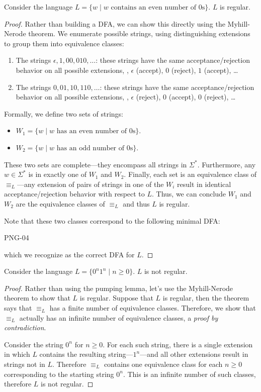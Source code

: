 \documentclass[11pt]{book}
\begin{document}
\begin{claim}
  Consider the language $L = \{ w \;|\; \text{$w$ contains an even number of $0$s} \}$.
  $L$ is regular.
\end{claim}
\begin{proof}
  Rather than building a DFA, we can show this directly using the Myhill-Nerode theorem.
  We enumerate possible strings, using distinguishing extensions to group them into equivalence classes:
  \begin{enumerate}
    \item The strings $\epsilon, 1, 00, 010, \ldots$: these strings have the same acceptance/rejection behavior on all possible extensions, \eg, $\epsilon$ (accept), $0$ (reject), $1$ (accept), \ldots
    \item The strings $0, 01, 10, 110, \ldots$: these strings have the same acceptance/rejection behavior on all possible extensions, \eg, $\epsilon$ (reject), $0$ (accept), $0$ (reject), \ldots
  \end{enumerate}
  Formally, we define two sets of strings:
  \begin{itemize}
    \item $W_1 = \{ w \;|\; \text{$w$ has an even number of 0s} \}$.
    \item $W_2 = \{ w \;|\; \text{$w$ has an odd number of 0s} \}$.
  \end{itemize}
  These two sets are complete---they encompass all strings in $\Sigma^*$.
  Furthermore, any $w \in \Sigma^*$ is in exactly one of $W_1$ and $W_2$.
  Finally, each set is an equivalence class of $\equiv_L$—any extension of pairs of strings in one of the $W_i$ result in identical acceptance/rejection behavior with respect to $L$.
  Thus, we can conclude $W_1$ and $W_2$ are the equivalence classes of $\equiv_L$ and thus $L$ is regular.

  Note that these two classes correspond to the following minimal DFA:

PNG-04

which we recognize as the correct DFA for $L$.
\end{proof}

\begin{claim}
  Consider the language $L = \{ 0^n1^n \;|\; n \geq 0 \}$.
  $L$ is not regular.
\end{claim}
\begin{proof}
  Rather than using the pumping lemma, let's use the Myhill-Nerode theorem to show that $L$ is regular.
  Suppose that $L$ is regular, then the theorem says that $\equiv_L$ has a finite number of equivalence classes.
  Therefore, we show that $\equiv_L$ actually has an infinite number of equivalence classes, a \emph{proof by contradiction}.

  Consider the string $0^n$ for $n \geq 0$.
  For each such string, there is a single extension in which $L$ contains the resulting string---$1^n$---and all other extensions result in strings not in $L$.
  Therefore $\equiv_L$ contains one equivalence class for each $n \geq 0$ corresponding to the starting string $0^n$.
  This is an infinite number of such classes, therefore $L$ is not regular.
\end{proof}
\end{document}
